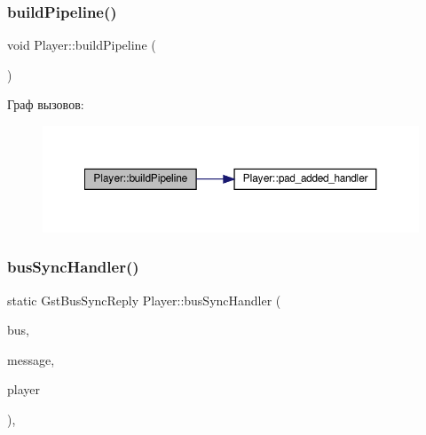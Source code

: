 \mbox{\label{class_player_aca2616201a97a901612fd9df7a900ca1}} 
\subsubsection{\texorpdfstring{build\+Pipeline()}{buildPipeline()}\hspace{0.1cm}{\footnotesize\ttfamily [2/2]}}
{\footnotesize\ttfamily void Player\+::build\+Pipeline (\begin{DoxyParamCaption}{ }\end{DoxyParamCaption})\hspace{0.3cm}{\ttfamily [private]}}

Граф вызовов\+:\nopagebreak
\begin{figure}[H]
\begin{center}
\leavevmode
\includegraphics[width=350pt]{class_player_aca2616201a97a901612fd9df7a900ca1_cgraph}
\end{center}
\end{figure}
\mbox{\label{class_player_a4f4e39756894a693bc45515f9eeded97}} 
\subsubsection{\texorpdfstring{bus\+Sync\+Handler()}{busSyncHandler()}\hspace{0.1cm}{\footnotesize\ttfamily [1/2]}}
{\footnotesize\ttfamily static Gst\+Bus\+Sync\+Reply Player\+::bus\+Sync\+Handler (\begin{DoxyParamCaption}\item[{Gst\+Bus $\ast$}]{bus,  }\item[{Gst\+Message $\ast$}]{message,  }\item[{\hyperlink{class_player}{Player} $\ast$}]{player }\end{DoxyParamCaption})\hspace{0.3cm}{\ttfamily [static]}, {\ttfamily [private]}}

